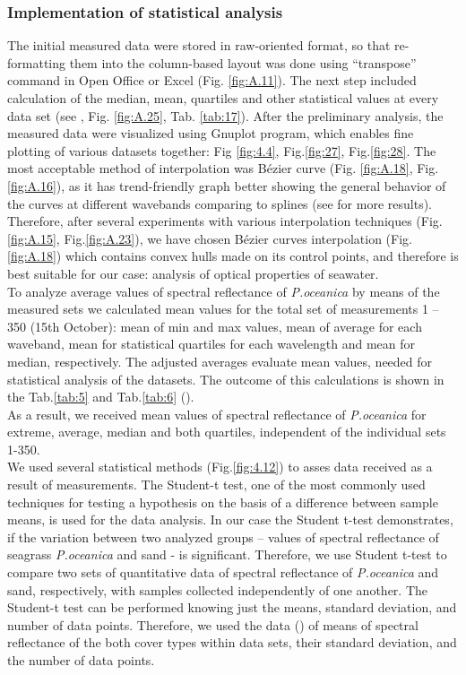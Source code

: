 \documentclass[11pt]{article}
\begin{document}
\subsubsection{Implementation of statistical analysis}
The initial measured data were stored in raw-oriented format, so that re-formatting them into the
column-based layout was done using “transpose” command in Open Office or Excel (Fig. \ref{fig:A.11}). The next step included
calculation of the median, mean, quartiles and other statistical values at every data set (see ,\label{dataprep} Fig. \ref{fig:A.25}, Tab. \ref{tab:17}).
After the preliminary analysis, the measured data were visualized using Gnuplot program, which
enables fine plotting of various datasets together: Fig \ref{fig:4.4}, Fig.\ref{fig:27}, Fig.\ref{fig:28}. The most acceptable method of interpolation was B\'ezier curve (Fig. \ref{fig:A.18}, Fig. \ref{fig:A.16}),
as it has trend-friendly graph better showing the general behavior of the curves at different wavebands
comparing to splines (see  for more results). 
Therefore, after several experiments with various interpolation techniques (Fig.\ref{fig:A.15}, Fig.\ref{fig:A.23}), we have chosen B\'ezier curves interpolation (Fig.\ref{fig:A.18}) which contains convex hulls made on its control points, and therefore is best suitable for our case: analysis of optical
properties of seawater.\\
To analyze average values of spectral reflectance of \textit{P.oceanica} by means of the measured sets we calculated 
mean values for the total set of measurements 1 – 350 (15th October): mean of min and max values, 
mean of average for each waveband, mean for statistical quartiles for each wavelength and mean for median, respectively. 
The adjusted averages evaluate mean values, needed for statistical analysis of the datasets. 
The outcome of this calculations is shown in the Tab.\ref{tab:5} and Tab.\ref{tab:6} (). \\
As a result, we received mean values of spectral reflectance of \textit{P.oceanica} for extreme, average, median and both quartiles,
independent of the individual sets 1-350. \\
We used several statistical methods (Fig.\ref{fig:4.12})\label{stan} to asses data received as a result of measurements. 
The Student-t test,
one of the most commonly used techniques for testing a hypothesis on the basis
of a difference between sample means, is used for the data analysis. In our case the Student t-test demonstrates, if the variation
between two analyzed groups – values of spectral reflectance of seagrass \textit{P.oceanica} and sand - is
significant. Therefore, we use Student t-test to compare two sets of quantitative data of spectral
reflectance of \textit{P.oceanica} and sand, respectively, with samples collected independently of one
another. The Student-t test can be performed knowing just the means, standard deviation, and number
of data points. Therefore, we used the data () of means of spectral reflectance of the both
 cover types within data sets, their standard deviation, and the number of data points.
\pagebreak
\end{document}
